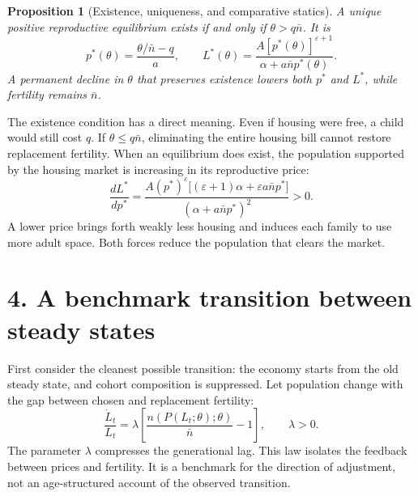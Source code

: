 \documentclass[11pt]{article}
\newtheorem{proposition}{Proposition}
\theoremstyle{definition}
\begin{document}
\begin{proposition}[Existence, uniqueness, and comparative statics]
\label{prop:equilibrium}
A unique positive reproductive equilibrium exists if and only if
$\theta>q\bar n$. It is
\begin{equation}
 p^*(\theta)=\frac{\theta/\bar n-q}{a},
 \qquad
 L^*(\theta)=
 \frac{A[p^*(\theta)]^{\varepsilon+1}}
 {\alpha+a\bar n p^*(\theta)}.
 \label{eq:steady_state}
\end{equation}
A permanent decline in $\theta$ that preserves existence lowers both $p^*$ and
$L^*$, while fertility remains $\bar n$.
\end{proposition}

The existence condition has a direct meaning. Even if housing were free, a
child would still cost $q$. If $\theta\leq q\bar n$, eliminating the entire
housing bill cannot restore replacement fertility. When an equilibrium does
exist, the population supported by the housing market is increasing in its
reproductive price:
\begin{equation}
 \frac{dL^*}{dp^*}
 =\frac{A(p^*)^\varepsilon
 \bigl[(\varepsilon+1)\alpha+\varepsilon a\bar n p^*\bigr]}
 {(\alpha+a\bar n p^*)^2}>0.
 \label{eq:scale_slope}
\end{equation}
A lower price brings forth weakly less housing and induces each family to use
more adult space. Both forces reduce the population that clears the market.

\section*{4. A benchmark transition between steady states}

First consider the cleanest possible transition: the economy starts from the
old steady state, and cohort composition is suppressed. Let population change
with the gap between chosen and replacement fertility:
\begin{equation}
 \frac{\dot L_t}{L_t}
 =\lambda\left[
 \frac{n(P(L_t;\theta);\theta)}{\bar n}-1
 \right],
 \qquad \lambda>0.
 \label{eq:population_law}
\end{equation}
The parameter $\lambda$ compresses the generational lag. This law isolates the
feedback between prices and fertility. It is a benchmark for the direction of
adjustment, not an age-structured account of the observed transition.
\end{document}
